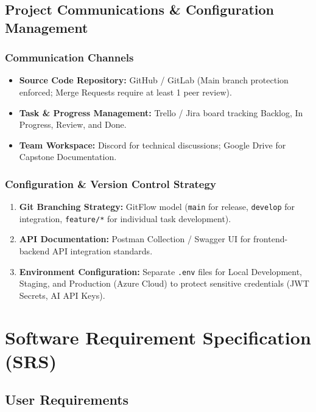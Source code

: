 \documentclass[12pt,a4paper]{article}
\begin{document}
\subsection{Project Communications \& Configuration Management}

\subsubsection{Communication Channels}
\begin{itemize}[leftmargin=1.5em, itemsep=0.2em]
    \item \textbf{Source Code Repository:} GitHub / GitLab (Main branch protection enforced; Merge Requests require at least 1 peer review).
    \item \textbf{Task \& Progress Management:} Trello / Jira board tracking Backlog, In Progress, Review, and Done.
    \item \textbf{Team Workspace:} Discord for technical discussions; Google Drive for Capstone Documentation.
\end{itemize}

\subsubsection{Configuration \& Version Control Strategy}
\begin{enumerate}[leftmargin=1.5em, itemsep=0.2em]
    \item \textbf{Git Branching Strategy:} GitFlow model (\texttt{main} for release, \texttt{develop} for integration, \texttt{feature/*} for individual task development).
    \item \textbf{API Documentation:} Postman Collection / Swagger UI for frontend-backend API integration standards.
    \item \textbf{Environment Configuration:} Separate \texttt{.env} files for Local Development, Staging, and Production (Azure Cloud) to protect sensitive credentials (JWT Secrets, AI API Keys).
\end{enumerate}


\section{Software Requirement Specification (SRS)}

\subsection{User Requirements}
\end{document}
